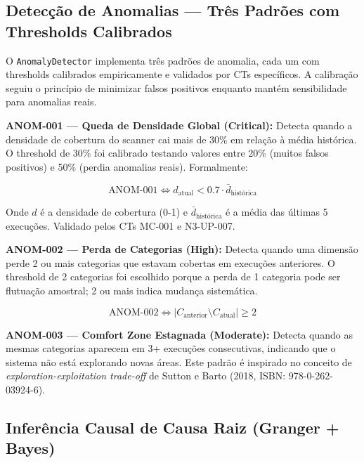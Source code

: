 \subsection{Detecção de Anomalias — Três Padrões com Thresholds Calibrados}

O \texttt{AnomalyDetector} implementa três padrões de anomalia, cada um com thresholds calibrados empiricamente e validados por CTs específicos. A calibração seguiu o princípio de minimizar falsos positivos enquanto mantém sensibilidade para anomalias reais.

\textbf{ANOM-001 — Queda de Densidade Global (Critical):} Detecta quando a densidade de cobertura do scanner cai mais de 30\% em relação à média histórica. O threshold de 30\% foi calibrado testando valores entre 20\% (muitos falsos positivos) e 50\% (perdia anomalias reais). Formalmente:

\begin{equation}
\text{ANOM-001} \iff d_{\text{atual}} < 0.7 \cdot \bar{d}_{\text{histórica}}
\label{eq:anom1}
\end{equation}

Onde $d$ é a densidade de cobertura (0-1) e $\bar{d}_{\text{histórica}}$ é a média das últimas 5 execuções. Validado pelos CTs MC-001 e N3-UP-007.

\textbf{ANOM-002 — Perda de Categorias (High):} Detecta quando uma dimensão perde 2 ou mais categorias que estavam cobertas em execuções anteriores. O threshold de 2 categorias foi escolhido porque a perda de 1 categoria pode ser flutuação amostral; 2 ou mais indica mudança sistemática.

\begin{equation}
\text{ANOM-002} \iff |C_{\text{anterior}} \setminus C_{\text{atual}}| \geq 2
\label{eq:anom2}
\end{equation}

\textbf{ANOM-003 — Comfort Zone Estagnada (Moderate):} Detecta quando as mesmas categorias aparecem em 3+ execuções consecutivas, indicando que o sistema não está explorando novas áreas. Este padrão é inspirado no conceito de \textit{exploration-exploitation trade-off} de Sutton e Barto (2018, ISBN: 978-0-262-03924-6).

\subsection{Inferência Causal de Causa Raiz (Granger + Bayes)}

